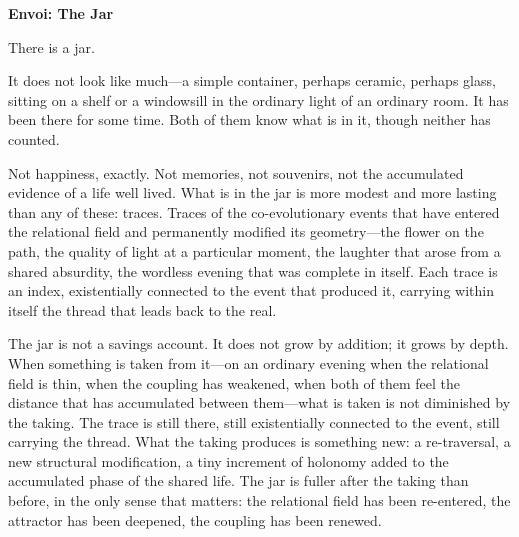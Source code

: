 \newpage
\goldrule
\begin{center}
{\large\bfseries\color{rosedeep} Envoi: The Jar}
\end{center}
\goldrule

\vspace{0.8em}

\noindent
There is a jar.

\vspace{0.5em}

\noindent
It does not look like much---a simple container, perhaps ceramic, perhaps glass, sitting on a shelf or a windowsill in the ordinary light of an ordinary room. It has been there for some time. Both of them know what is in it, though neither has counted.

\vspace{0.5em}

\noindent
{}

\vspace{0.5em}

\noindent
Not happiness, exactly. Not memories, not souvenirs, not the accumulated evidence of a life well lived. What is in the jar is more modest and more lasting than any of these: traces. Traces of the co-evolutionary events that have entered the relational field and permanently modified its geometry---the flower on the path, the quality of light at a particular moment, the laughter that arose from a shared absurdity, the wordless evening that was complete in itself. Each trace is an index, existentially connected to the event that produced it, carrying within itself the thread that leads back to the real.

\vspace{0.5em}

\noindent
The jar is not a savings account. It does not grow by addition; it grows by depth. When something is taken from it---on an ordinary evening when the relational field is thin, when the coupling has weakened, when both of them feel the distance that has accumulated between them---what is taken is not diminished by the taking. The trace is still there, still existentially connected to the event, still carrying the thread. What the taking produces is something new: a re-traversal, a new structural modification, a tiny increment of holonomy added to the accumulated phase of the shared life. The jar is fuller after the taking than before, in the only sense that matters: the relational field has been re-entered, the attractor has been deepened, the coupling has been renewed.

